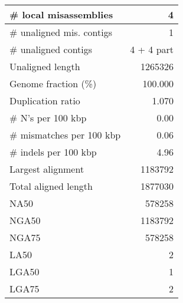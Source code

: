 \documentclass[12pt,a4paper]{article}
\begin{document}
\begin{table}[ht]
\begin{center}
\begin{tabular}{|l*{1}{|r}|}
\# local misassemblies & 4 \\ \hline
\# unaligned mis. contigs & 1 \\ \hline
\# unaligned contigs & 4 + 4 part \\ \hline
Unaligned length & 1265326 \\ \hline
Genome fraction (\%) & 100.000 \\ \hline
Duplication ratio & 1.070 \\ \hline
\# N's per 100 kbp & 0.00 \\ \hline
\# mismatches per 100 kbp & 0.06 \\ \hline
\# indels per 100 kbp & 4.96 \\ \hline
Largest alignment & 1183792 \\ \hline
Total aligned length & 1877030 \\ \hline
NA50 & 578258 \\ \hline
NGA50 & 1183792 \\ \hline
NGA75 & 578258 \\ \hline
LA50 & 2 \\ \hline
LGA50 & 1 \\ \hline
LGA75 & 2 \\ \hline
\end{tabular}
\end{center}
\end{table}
\end{document}
